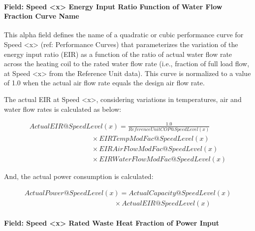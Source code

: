 \paragraph{Field: Speed \textless{}x\textgreater{} Energy Input Ratio Function of Water Flow Fraction Curve Name}\label{field-speed-x-energy-input-ratio-function-of-water-flow-fraction-curve-name-1}

This alpha field defines the name of a quadratic or cubic performance curve for Speed \textless{}x\textgreater{} (ref: Performance Curves) that parameterizes the variation of the energy input ratio (EIR) as a function of the ratio of actual water flow rate across the heating coil to the rated water flow rate (i.e., fraction of full load flow, at Speed \textless{}x\textgreater{} from the Reference Unit data). This curve is normalized to a value of 1.0 when the actual air flow rate equals the design air flow rate.

The actual EIR at Speed \textless{}x\textgreater{}, considering variations in temperatures, air and water flow rates is calculated as below:

\begin{equation}
\begin{array}{l}
ActualEIR@SpeedLevel \left( x \right) = \frac{{1.0}}{{ReferenceUnitCOP@SpeedLevel(x)}} \\
\quad \quad \quad \quad \quad \quad \quad \quad \quad \times EIRTempModFac@SpeedLevel(x) \\
\quad \quad \quad \quad \quad \quad \quad \quad \quad \times EIRAirFlowModFac@SpeedLevel(x) \\
\quad \quad \quad \quad \quad \quad \quad \quad \quad \times EIRWaterFlowModFac@SpeedLevel(x)
\end{array}
\end{equation}

And, the actual power consumption is calculated:

\begin{equation}
\begin{array}{l}
ActualPower@SpeedLevel\left( x \right) = ActualCapacity@SpeedLevel\left( x \right) \\
\quad \quad \quad \quad \quad \quad \quad \quad \quad \quad \quad \quad \quad \times ActualEIR@SpeedLevel\left( x \right)
\end{array}
\end{equation}

\paragraph{Field: Speed \textless{}x\textgreater{} Rated Waste Heat Fraction of Power Input}\label{field-speed-x-rated-waste-heat-fraction-of-power-input-2}

